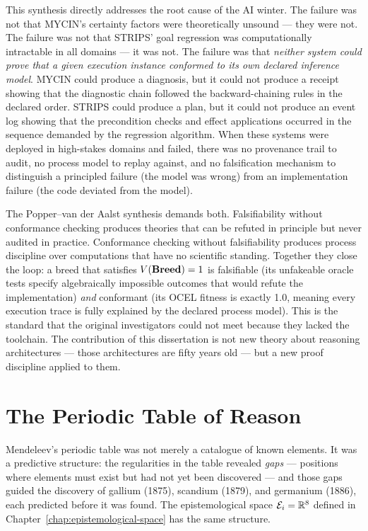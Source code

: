 This synthesis directly addresses the root cause of the AI winter. The failure was not
that MYCIN's certainty factors were theoretically unsound — they were not. The failure was
not that STRIPS' goal regression was computationally intractable in all domains — it was
not. The failure was that \emph{neither system could prove that a given execution instance
conformed to its own declared inference model}. MYCIN could produce a diagnosis, but it
could not produce a receipt showing that the diagnostic chain followed the backward-chaining
rules in the declared order. STRIPS could produce a plan, but it could not produce an event
log showing that the precondition checks and effect applications occurred in the sequence
demanded by the regression algorithm. When these systems were deployed in high-stakes
domains and failed, there was no provenance trail to audit, no process model to replay
against, and no falsification mechanism to distinguish a principled failure (the model was
wrong) from an implementation failure (the code deviated from the model).

The Popper--van der Aalst synthesis demands both. Falsifiability without conformance
checking produces theories that can be refuted in principle but never audited in practice.
Conformance checking without falsifiability produces process discipline over computations
that have no scientific standing. Together they close the loop: a breed that satisfies
$V(\mathbf{Breed}) = 1$ is falsifiable (its unfakeable oracle tests specify algebraically impossible
outcomes that would refute the implementation) \emph{and} conformant (its OCEL fitness is
exactly 1.0, meaning every execution trace is fully explained by the declared process
model). This is the standard that the original investigators could not meet because they
lacked the toolchain. The contribution of this dissertation is not new theory about
reasoning architectures — those architectures are fifty years old — but a new proof
discipline applied to them.

\section{The Periodic Table of Reason}
\label{sec:periodic-table}

Mendeleev's periodic table was not merely a catalogue of known elements. It was a
predictive structure: the regularities in the table revealed \emph{gaps} — positions where
elements must exist but had not yet been discovered — and those gaps guided the discovery
of gallium (1875), scandium (1879), and germanium (1886), each predicted before it was
found. The epistemological space $\mathcal{E}_i = \mathbb{R}^8$ defined in
Chapter~\ref{chap:epistemological-space} has the same structure.

